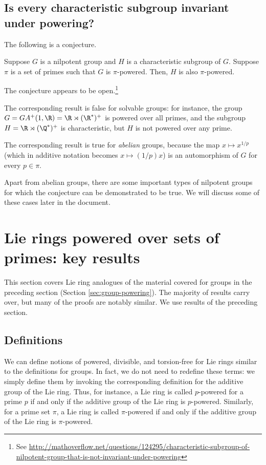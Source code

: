 \documentclass{ucetd}
\begin{document}
\subsection{Is every characteristic subgroup invariant under powering?}

The following is a conjecture.

\begin{conjecture}\label{conj:charpowering}
  Suppose $G$ is a nilpotent group and $H$ is a characteristic
  subgroup of $G$. Suppose $\pi$ is a set of primes such that $G$ is
  $\pi$-powered. Then, $H$ is also $\pi$-powered.
\end{conjecture}

The conjecture appears to be open.\footnote{See \url{http://mathoverflow.net/questions/124295/characteristic-subgroup-of-nilpotent-group-that-is-not-invariant-under-powering}}

The corresponding result is false for solvable groups: for instance,
the group $G = GA^+(1,\R) = \R \rtimes (\R^*)^+$ is powered over all
primes, and the subgroup $H = \R \rtimes (\Q^*)^+$ is characteristic,
but $H$ is not powered over any prime.

The corresponding result is true for {\em abelian} groups, because the
map $x \mapsto x^{1/p}$ (which in additive notation becomes $x \mapsto
(1/p)x$) is an automorphism of $G$ for every $p \in \pi$.

Apart from abelian groups, there are some important types of nilpotent
groups for which the conjecture can be demonstrated to be true. We
will discuss some of these cases later in the document.

\section{Lie rings powered over sets of primes: key results}\label{sec:lie-ring-powering}

This section covers Lie ring analogues of the material covered for
groups in the preceding section (Section
\ref{sec:group-powering}). The majority of results carry over, but
many of the proofs are notably similar. We use results of the
preceding section.

\subsection{Definitions}\label{sec:lie-ring-powering-def}

We can define notions of powered, divisible, and torsion-free for Lie
rings similar to the definitions for groups. In fact, we do not need
to redefine these terms: we simply define them by invoking the
corresponding definition for the additive group of the Lie ring. Thus,
for instance, a Lie ring is called $p$-powered for a prime $p$ if and
only if the additive group of the Lie ring is $p$-powered. Similarly,
for a prime set $\pi$, a Lie ring is called $\pi$-powered if and only
if the additive group of the Lie ring is $\pi$-powered.
\end{document}
